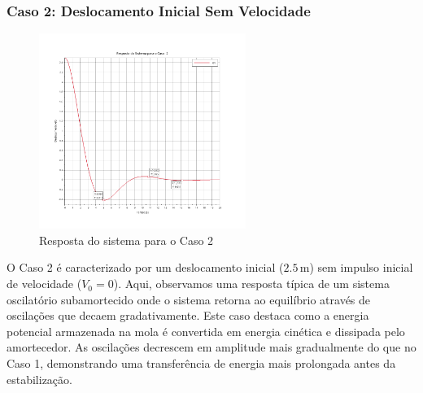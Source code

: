 \subsubsection{Caso 2: Deslocamento Inicial Sem Velocidade}
\begin{figure}[H]
    \centering
    \includegraphics[width=0.6\textwidth]{atividades/1-atividade/assets/caso2.png}
    \caption{Resposta do sistema para o Caso 2}
\end{figure}
O Caso 2 é caracterizado por um deslocamento inicial (\(2.5 \, \text{m}\)) sem impulso inicial de velocidade (\(V_0 = 0\)). Aqui, observamos uma resposta típica de um sistema oscilatório subamortecido onde o sistema retorna ao equilíbrio através de oscilações que decaem gradativamente. Este caso destaca como a energia potencial armazenada na mola é convertida em energia cinética e dissipada pelo amortecedor. As oscilações decrescem em amplitude mais gradualmente do que no Caso 1, demonstrando uma transferência de energia mais prolongada antes da estabilização.

